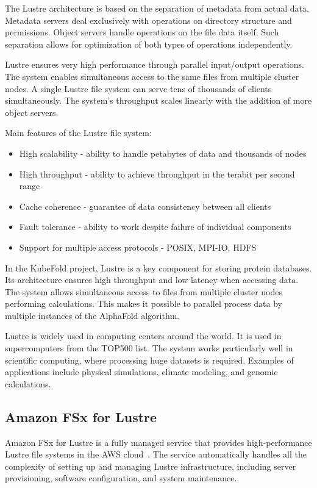 The Lustre architecture is based on the separation of metadata from actual data.
Metadata servers deal exclusively with operations on directory structure and permissions.
Object servers handle operations on the file data itself.
Such separation allows for optimization of both types of operations independently.

Lustre ensures very high performance through parallel input/output operations.
The system enables simultaneous access to the same files from multiple cluster nodes.
A single Lustre file system can serve tens of thousands of clients simultaneously.
The system's throughput scales linearly with the addition of more object servers.

Main features of the Lustre file system:
\begin{itemize}
    \item High scalability - ability to handle petabytes of data and thousands of nodes
    \item High throughput - ability to achieve throughput in the terabit per second range
    \item Cache coherence - guarantee of data consistency between all clients
    \item Fault tolerance - ability to work despite failure of individual components
    \item Support for multiple access protocols - POSIX, MPI-IO, HDFS
\end{itemize}

In the KubeFold project, Lustre is a key component for storing protein databases.
Its architecture ensures high throughput and low latency when accessing data.
The system allows simultaneous access to files from multiple cluster nodes performing calculations.
This makes it possible to parallel process data by multiple instances of the AlphaFold algorithm.

Lustre is widely used in computing centers around the world.
It is used in supercomputers from the TOP500 list.
The system works particularly well in scientific computing, where processing huge datasets is required.
Examples of applications include physical simulations, climate modeling, and genomic calculations.

\subsection{Amazon FSx for Lustre}

Amazon FSx for Lustre is a fully managed service that provides high-performance Lustre file systems in the AWS cloud~\cite{amazon_fsx}.
The service automatically handles all the complexity of setting up and managing Lustre infrastructure, including server provisioning, software configuration, and system maintenance.

